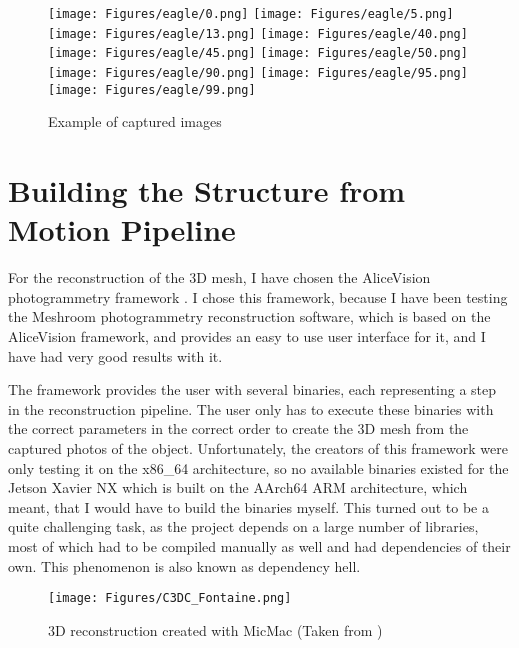 \begin{figure}[h!]
	\begin{center}
	\texttt{[image: Figures/eagle/0.png]}
	\texttt{[image: Figures/eagle/5.png]}
	\texttt{[image: Figures/eagle/13.png]}
	\texttt{[image: Figures/eagle/40.png]}
	\texttt{[image: Figures/eagle/45.png]}
	\texttt{[image: Figures/eagle/50.png]}
	\texttt{[image: Figures/eagle/90.png]}
	\texttt{[image: Figures/eagle/95.png]}
	\texttt{[image: Figures/eagle/99.png]}
	\end{center}
	\caption{ Example of captured images}	
\end{figure}

\newpage
\section{Building the Structure from Motion Pipeline}

For the reconstruction of the 3D mesh, I have chosen the AliceVision photogrammetry framework \cite{Moulon2012, Jancosek2011}.
I chose this framework, because I have been testing the Meshroom photogrammetry reconstruction software, which is based on the AliceVision framework, and provides an easy to use user interface for it, and I have had very good results with it.

The framework provides the user with several binaries, each representing a step in the reconstruction pipeline.
The user only has to execute these binaries with the correct parameters in the correct order to create the 3D mesh from the captured photos of the object.
Unfortunately, the creators of this framework were only testing it on the x86\_64 architecture, so no available binaries existed for the Jetson Xavier NX which is built on the AArch64 ARM architecture, which meant, that I would have to build the binaries myself.
This turned out to be a quite challenging task, as the project depends on a large number of libraries, most of which had to be compiled manually as well and had dependencies of their own.
This phenomenon is also known as dependency hell.

\begin{figure}[h!]
	\centering
	\texttt{[image: Figures/C3DC\_Fontaine.png]}	
	\caption{3D reconstruction created with MicMac (Taken from \cite{micmac_fontaine})}
\end{figure}

